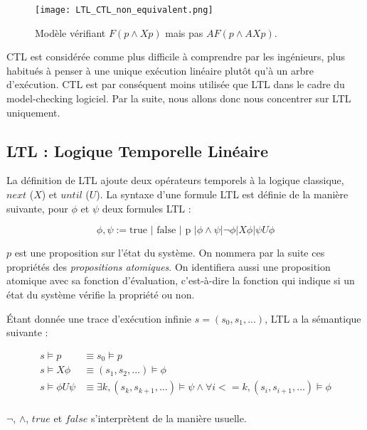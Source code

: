\begin{figure}
\begin{center}
\texttt{[image: LTL\_CTL\_non\_equivalent.png]}
\caption{Modèle vérifiant \(F (p \land X p)\) mais pas \(AF (p \land AX p)\).}
\label{LTL_vs_CTL}
\end{center}
\end{figure}

\ac{CTL} est considérée comme plus difficile à comprendre par les ingénieurs,
plus habitués à penser à une unique exécution linéaire plutôt qu'à un arbre
d'exécution\cite{RCTL_formulas}. \ac{CTL} est par conséquent moins utilisée que
\ac{LTL} dans le cadre du model-checking logiciel. Par la suite, nous allons
donc nous concentrer sur \ac{LTL} uniquement.

\subsection{LTL : Logique Temporelle Linéaire}

La définition de \ac{LTL}\cite{pnueli_LTL} ajoute deux opérateurs temporels à la
logique classique, \(next\) (\(X\)) et \(until\) (\(U\)). La syntaxe d'une
formule \ac{LTL} est définie de la manière suivante, pour \(\phi\) et \(\psi\)
deux formules \ac{LTL} :

\[
\phi, \psi := \text{true }| \text{ false } | \text{ p } |
             \phi \land \psi | \lnot \phi | X \phi | \psi U \phi
\]

\(p\) est une proposition sur l'état du système. On nommera par la suite
ces propriétés des \emph{propositions atomiques}. On identifiera aussi
une proposition atomique avec sa fonction d'évaluation, c'est-à-dire la
fonction qui indique si un état du système vérifie la propriété ou non.

Étant donnée une trace d'exécution infinie \(s = (s_0, s_1, ...)\), \ac{LTL} a
la sémantique suivante :

\[
\begin{aligned}
s \models p & \equiv s_0 \models p \\
s \models X \phi & \equiv (s_1, s_2, \dots) \models \phi \\
s \models \phi U \psi & \equiv \exists k, (s_k, s_{k+1}, \dots) \models \psi
                        \land \forall i <= k, (s_i, s_{i+1}, \dots) \models \phi \\
\end{aligned}
\]

\(\lnot\), \(\land\), \(true\) et \(false\) s'interprètent de la manière
usuelle.

